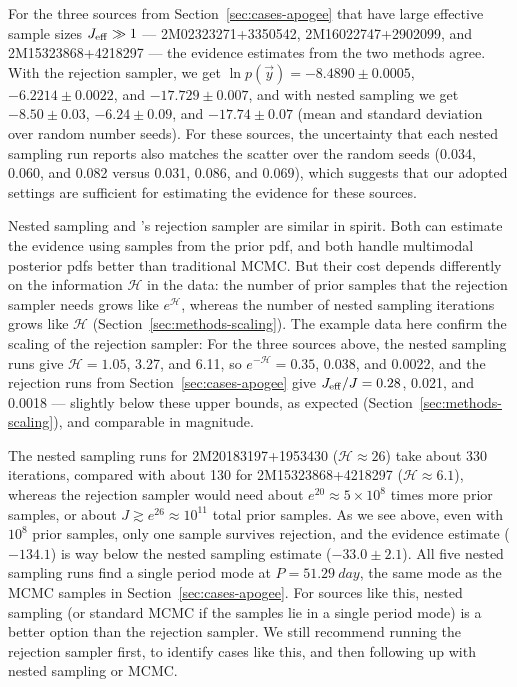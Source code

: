 \documentclass[twocolumn]{AASTeX7/aastex701}
\newcommand{\harv}{\package{harv}}
\begin{document}
For the three sources from Section~\ref{sec:cases-apogee} that have large effective
sample sizes $J_{\rm eff} \gg 1$ --- 2M02323271+3350542, 2M16022747+2902099, and
2M15323868+4218297 --- the evidence estimates from the two methods agree.
With the rejection sampler, we get $\ln p(\vec{y}) = -8.4890 \pm 0.0005$, $-6.2214 \pm
0.0022$, and $-17.729 \pm 0.007$, and with nested sampling we get $-8.50 \pm 0.03$,
$-6.24 \pm 0.09$, and $-17.74 \pm 0.07$ (mean and standard deviation over random number
seeds).
For these sources, the uncertainty that each nested sampling run reports also matches
the scatter over the random seeds (0.034, 0.060, and 0.082 versus 0.031, 0.086,
and 0.069), which suggests that our adopted settings are sufficient for estimating the
evidence for these sources.

Nested sampling and \harv's rejection sampler are similar in spirit.
Both can estimate the evidence using samples from the prior pdf, and both handle
multimodal posterior pdfs better than traditional MCMC.
But their cost depends differently on the information $\mathcal{H}$ in the data: the
number of prior samples that the rejection sampler needs grows like $e^{\mathcal{H}}$,
whereas the number of nested sampling iterations grows like $\mathcal{H}$
(Section~\ref{sec:methods-scaling}).
The example data here confirm the scaling of the rejection sampler:
For the three sources above, the nested sampling runs give $\mathcal{H} = 1.05$, 3.27,
and 6.11, so $e^{-\mathcal{H}} = 0.35$, 0.038, and 0.0022, and the rejection runs from
Section~\ref{sec:cases-apogee} give $J_{\rm eff}/J = 0.28$, 0.021, and 0.0018 ---
slightly below these upper bounds, as expected (Section~\ref{sec:methods-scaling}), and
comparable in magnitude.

The nested sampling runs for 2M20183197+1953430 ($\mathcal{H} \approx 26$) take about
330 iterations, compared with about 130 for 2M15323868+4218297 ($\mathcal{H} \approx
6.1$), whereas the rejection sampler would need about $e^{20} \approx 5 \times 10^{8}$
times more prior samples, or about $J \gtrsim e^{26} \approx 10^{11}$ total prior
samples.
As we see above, even with $10^8$ prior samples, only one sample survives rejection, and
the evidence estimate ($-134.1$) is way below the nested sampling estimate ($-33.0 \pm
2.1$).
All five nested sampling runs find a single period mode at $P = 51.29~\unit{day}$, the
same mode as the MCMC samples in Section~\ref{sec:cases-apogee}.
For sources like this, nested sampling (or standard MCMC if the samples lie in a single
period mode) is a better option than the rejection sampler.
We still recommend running the rejection sampler first, to identify cases like this, and
then following up with nested sampling or MCMC.
\end{document}
